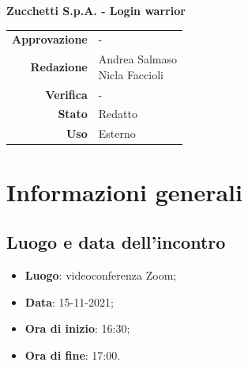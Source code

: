\documentclass[11pt]{article}
\begin{document}
\begin{titlepage}
\begin{center}
			\large
			\textbf{Zucchetti  S.p.A. - Login warrior}\\ 
			
			
			
			
			\vfill
			
			
			\begin{tabular}{r|l}
				\textbf{Approvazione} &  -\\
				\textbf{Redazione} &  \parbox[t]{5cm}{Andrea Salmaso \\Nicla Faccioli}\\
				\textbf{Verifica} &  -\\
				\textbf{Stato} & Redatto \\
				\textbf{Uso} & Esterno
			\end{tabular}
			\vfill
			
		\end{center}
	\end{titlepage}

	\section{Informazioni generali}
	\subsection{Luogo e data dell'incontro}
	\begin{itemize}
		\item \textbf{Luogo}: videoconferenza Zoom;
		\item \textbf{Data}: 15-11-2021;
		\item \textbf{Ora di inizio}: 16:30;
		\item \textbf{Ora di fine}: 17:00.
	\end{itemize}
	
\end{document}

